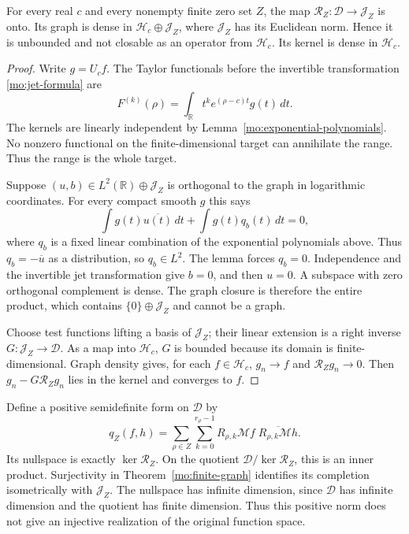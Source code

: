 \begin{theorem}
\label{mo:finite-graph}
For every real $c$ and every nonempty finite zero set $Z$, the map
$\mathcal R_Z:\mathscr D\to\mathscr J_Z$ is onto. Its graph is
dense in $\mathscr H_c\oplus\mathscr J_Z$, where $\mathscr J_Z$
has its Euclidean norm. Hence it is unbounded and not closable
as an operator from $\mathscr H_c$. Its kernel is dense in
$\mathscr H_c$.
\end{theorem}
\begin{proof}
Write $g=U_cf$. The Taylor functionals before the invertible
transformation \eqref{mo:jet-formula} are
\[
 F^{(k)}(\rho)=\int_{\mathbb R}t^k
                       e^{(\rho-c)t}g(t)\,dt.
\]
The kernels are linearly independent by
Lemma~\ref{mo:exponential-polynomials}. No nonzero functional on the
finite-dimensional target can annihilate the range. Thus the
range is the whole target.

Suppose $(u,b)\in L^2(\mathbb R)\oplus\mathscr J_Z$ is orthogonal
to the graph in logarithmic coordinates. For every compact smooth
$g$ this says
\[
 \int g(t)\overline{u(t)}\,dt+\int g(t)q_b(t)\,dt=0,
\]
where $q_b$ is a fixed linear combination of the exponential
polynomials above. Thus $q_b=-\overline u$ as a distribution,
so $q_b\in L^2$. The lemma forces $q_b=0$. Independence and the
invertible jet transformation give $b=0$, and then $u=0$.
A subspace with zero orthogonal complement is dense. The graph
closure is therefore the entire product, which contains
$\{0\}\oplus\mathscr J_Z$ and cannot be a graph.

Choose test functions lifting a basis of $\mathscr J_Z$; their
linear extension is a right inverse $G:\mathscr J_Z\to\mathscr D$.
As a map into $\mathscr H_c$, $G$ is bounded because its domain is
finite-dimensional. Graph density gives, for each $f\in\mathscr H_c$,
$g_n\to f$ and $\mathcal R_Zg_n\to0$. Then
$g_n-G\mathcal R_Zg_n$ lies in the kernel and converges to $f$.
\end{proof}

Define a positive semidefinite form on $\mathscr D$ by
\[
 q_Z(f,h)=\sum_{\rho\in Z}\sum_{k=0}^{r_\rho-1}
 R_{\rho,k}\mathcal Mf\;
 \overline{R_{\rho,k}\mathcal Mh}.
\]
Its nullspace is exactly $\ker\mathcal R_Z$. On the quotient
$\mathscr D/\ker\mathcal R_Z$, this is an inner product.
Surjectivity in Theorem~\ref{mo:finite-graph} identifies its completion
isometrically with $\mathscr J_Z$. The nullspace has infinite
dimension, since $\mathscr D$ has infinite dimension and the
quotient has finite dimension. Thus this positive norm does not
give an injective realization of the original function space.

